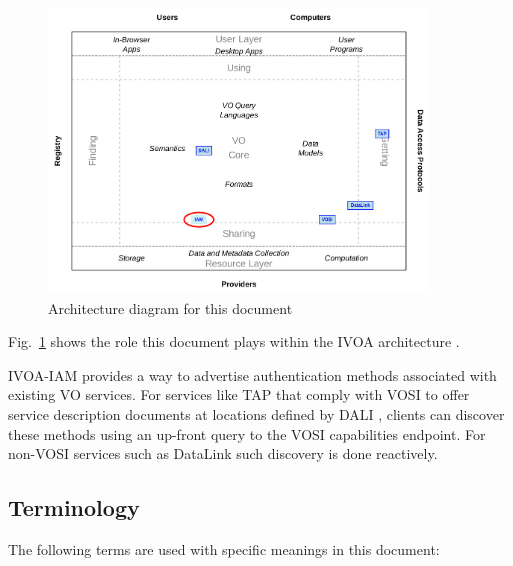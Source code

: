 \documentclass[11pt,a4paper]{ivoa}
\begin{document}
\begin{figure}
\centering


\includegraphics[width=0.9\textwidth]{role_diagram.pdf}
\caption{Architecture diagram for this document}
\label{fig:archdiag}
\end{figure}

Fig.~\ref{fig:archdiag} shows the role this document plays within the
IVOA architecture \citep{2021ivoa.spec.1101D}.

IVOA-IAM provides a way to advertise authentication methods
associated with existing VO services.
For services like TAP \citep{2019ivoa.spec.0927D}
that comply with VOSI \citep{2017ivoa.spec.0524G} to
offer service description documents at locations
defined by DALI \citep{2017ivoa.spec.0517D},
clients can discover these methods
using an up-front query to the VOSI capabilities endpoint.
For non-VOSI services such as DataLink \citep{2015ivoa.spec.0617D}
such discovery is done reactively.


\subsection{Terminology}

The following terms are used with specific meanings in this document:
\end{document}
